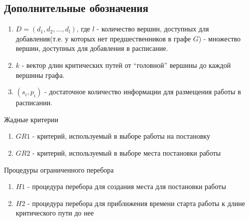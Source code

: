 \subsection{Дополнительные обозначения}
\begin{enumerate}
    \item $D= \left( d_1, d_2, \dots, d_l \right)$, где $l$ - количество вершин, доступных для добавления(т.е. у которых нет предшественников в графе $G$) - множество вершин, доступных для добавления в расписание.
    \item $k$ - вектор длин критических путей от ``головной'' вершины до каждой вершины графа.
    \item $\left( s_i, p_i \right)$ - достаточное количество информации для размещения работы в расписании.
\end{enumerate}
Жадные критерии
\begin{enumerate}
    \item $GR1$ - критерий, используемый в выборе работы на постановку
    \item $GR2$ - критерий, используемый в выборе места постановки работы
\end{enumerate}
Процедуры ограниченного перебора
\begin{enumerate}
    \item $H1$ - процедура перебора для создания места для постановки работы
    \item $H2$ - процедура перебора для приближения времени старта работы к длине критического пути до нее
\end{enumerate}

